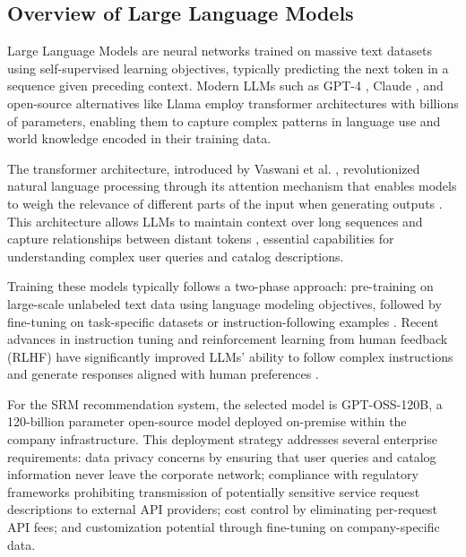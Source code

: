 \subsection{Overview of Large Language Models}

Large Language Models are neural networks trained on massive text datasets using self-supervised learning objectives, typically predicting the next token in a sequence given preceding context. Modern LLMs such as GPT-4 \cite{openai2024gpt4technicalreport}, Claude \cite{anthropic2024claude}, and open-source alternatives like Llama \cite{touvron2023llamaopenefficientfoundation} employ transformer architectures \cite{vaswani2023attentionneed} with billions of parameters, enabling them to capture complex patterns in language use and world knowledge encoded in their training data.

The transformer architecture, introduced by Vaswani et al. \cite{vaswani2023attentionneed}, revolutionized natural language processing through its attention mechanism that enables models to weigh the relevance of different parts of the input when generating outputs \cite{vaswani2023attentionneed}. This architecture allows LLMs to maintain context over long sequences and capture relationships between distant tokens \cite{vaswani2023attentionneed}, essential capabilities for understanding complex user queries and catalog descriptions.

Training these models typically follows a two-phase approach: pre-training on large-scale unlabeled text data using language modeling objectives, followed by fine-tuning on task-specific datasets or instruction-following examples \cite{ouyang2022traininglanguagemodelsfollow}. Recent advances in instruction tuning and reinforcement learning from human feedback (RLHF) have significantly improved LLMs' ability to follow complex instructions and generate responses aligned with human preferences \cite{ouyang2022traininglanguagemodelsfollow}.

For the SRM recommendation system, the selected model is GPT-OSS-120B, a 120-billion parameter open-source model deployed on-premise within the company infrastructure. This deployment strategy addresses several enterprise requirements: data privacy concerns by ensuring that user queries and catalog information never leave the corporate network; compliance with regulatory frameworks prohibiting transmission of potentially sensitive service request descriptions to external API providers; cost control by eliminating per-request API fees; and customization potential through fine-tuning on company-specific data.

